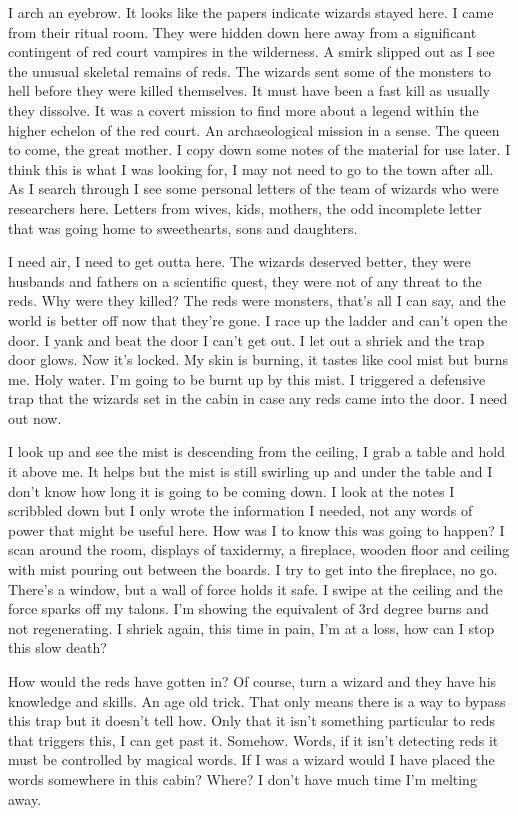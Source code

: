 I arch an eyebrow. It looks like the papers indicate wizards stayed here. I came from their ritual room. They were hidden down here away from a significant contingent of red court vampires in the wilderness. A smirk slipped out as I see the unusual skeletal remains of reds. The wizards sent some of the monsters to hell before they were killed themselves. It must have been a fast kill as usually they dissolve. It was a covert mission to find more about a legend within the higher echelon of the red court. An archaeological mission in a sense. The queen to come, the great mother. I copy down some notes of the material for use later. I think this is what I was looking for, I may not need to go to the town after all. As I search through I see some personal letters of the team of wizards who were researchers here. Letters from wives, kids, mothers, the odd incomplete letter that was going home to sweethearts, sons and daughters.

I need air, I need to get outta here. The wizards deserved better, they were husbands and fathers on a scientific quest, they were not of any threat to the reds. Why were they killed? The reds were monsters, that's all I can say, and the world is better off now that they're gone. I race up the ladder and can't open the door. I yank and beat the door I can't get out. I let out a shriek and the trap door glows. Now it's locked. My skin is burning, it tastes like cool mist but burns me. Holy water. I'm going to be burnt up by this mist. I triggered a defensive trap that the wizards set in the cabin in case any reds came into the door. I need out now.

I look up and see the mist is descending from the ceiling, I grab a table and hold it above me. It helps but the mist is still swirling up and under the table and I don't know how long it is going to be coming down. I look at the notes I scribbled down but I only wrote the information I needed, not any words of power that might be useful here. How was I to know this was going to happen? I scan around the room, displays of taxidermy, a fireplace, wooden floor and ceiling with mist pouring out between the boards. I try to get into the fireplace, no go. There's a window, but a wall of force holds it safe. I swipe at the ceiling and the force sparks off my talons. I'm showing the equivalent of 3rd degree burns and not regenerating. I shriek again, this time in pain, I'm at a loss, how can I stop this slow death?

How would the reds have gotten in? Of course, turn a wizard and they have his knowledge and skills. An age old trick. That only means there is a way to bypass this trap but it doesn't tell how. Only that it isn't something particular to reds that triggers this, I can get past it. Somehow. Words, if it isn't detecting reds it must be controlled by magical words. If I was a wizard would I have placed the words somewhere in this cabin? Where? I don't have much time I'm melting away.

